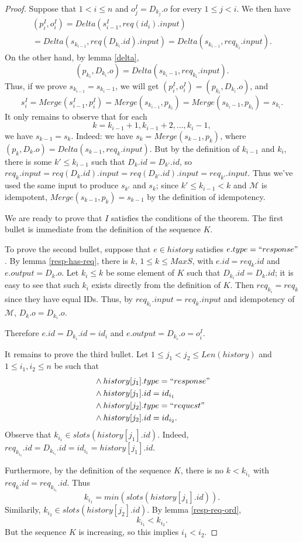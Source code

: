 \documentclass[12pt,a4paper,en]{pracamgr}
\newcommand{\mc}[1]{\mathcal{#1}}
\begin{document}
\begin{proof}
    Suppose that $1 < i \le n$ and $o_j^I = D_{k_j}.o$ for every $1 \le j < i$. We then have
    \begin{multline*}
        (p_i^I, o_i^I) = Delta(s_{i-1}^I, req(id_i).input)\\
            = Delta(s_{k_{i-1}}, req(D_{k_i}.id).input) = Delta(s_{k_{i-1}}, req_{k_i}.input).
    \end{multline*}
    On the other hand, by lemma \ref{delta},
        $$ (p_{k_i}, D_{k_i}.o) = Delta(s_{k_i-1}, req_{k_i}.input). $$
    Thus, if we prove $s_{k_{i-1}} = s_{k_i-1}$,
    we will get $(p_i^I, o_i^I) = (p_{k_i}, D_{k_i}.o)$, and
    $$s_i^I = Merge(s_{i-1}^I, p_i^I) = Merge(s_{k_{i-1}}, p_{k_i}) = Merge(s_{k_i-1}, p_{k_i}) = s_{k_i}.$$
    It only remains to observe that for each
    $$ k = k_{i-1}+1, k_{i-1}+2, \dots, k_{i}-1, $$
    we have $ s_{k-1} = s_k$. Indeed: we have $s_k = Merge(s_{k-1}, p_k)$, where $(p_k, D_k.o) = Delta(s_{k-1}, req_k.input)$. But by the definition of $k_{i-1}$ and $k_i$, there is some $k' \le k_{i-1}$ such that $D_k.id = D_{k'}.id$, so $req_k.input = req(D_k.id).input = req(D_{k'}.id).input = req_{k'}.input$. Thus we've used the same input to produce $s_{k'}$ and $s_k$; since $k' \le k_{i-1} < k$ and $\mc M$ is idempotent, $Merge(s_{k-1}, p_k) = s_{k-1}$ by the definition of idempotency.

    We are ready to prove that $I$ satisfies the conditions of the theorem. The first bullet is immediate from the definition of the sequence $K$.

    To prove the second bullet, suppose that $e \in history$ satisfies $e.type = ``response"$. By lemma \ref{resp-has-req}, there is $k$, $1 \le k \le MaxS$, with $e.id = req_k.id$ and $e.output = D_k.o$. Let $k_i \le k$ be some element of $K$ such that $D_{k_i}.id = D_k.id$; it is easy to see that such $k_i$ exists directly from the definition of $K$. Then $req_{k_i} = req_k$ since they have equal IDs. Thus, by $req_{k_i}.input = req_k.input$ and idempotency of $\mc M$, $D_k.o = D_{k_i}.o$.

    Therefore $e.id = D_{k_i}.id = id_i$ and $e.output = D_{k_i}.o = o_i^I$.

    It remains to prove the third bullet. Let $1 \le j_1 < j_2 \le Len(history)$ and $1 \le i_1, i_2 \le n$ be such that
    \begin{align*}
        & \land history[j_1].type = ``response"\\
        & \land history[j_1].id = id_{i_1}\\
        & \land history[j_2].type = ``request"\\
        & \land history[j_2].id = id_{i_2}.
    \end{align*}
    Observe that $k_{i_1} \in slots(history[j_1].id)$. Indeed, $req_{k_{i_1}}.id = D_{k_{i_1}}.id = id_{i_1} = history[j_1].id$.

    Furthermore, by the definition of the sequence $K$, there is no $k < k_{i_1}$ with $req_k.id = req_{k_{i_1}}.id$. Thus
    $$ k_{i_1} = min(slots(history[j_1].id)). $$
    Similarily, $k_{i_2} \in slots(history[j_2].id)$. By lemma \ref{resp-req-ord},
    $$ k_{i_1} < k_{i_2}. $$
    But the sequence $K$ is increasing, so this implies $i_1 < i_2$.
\end{proof}
\end{document}
